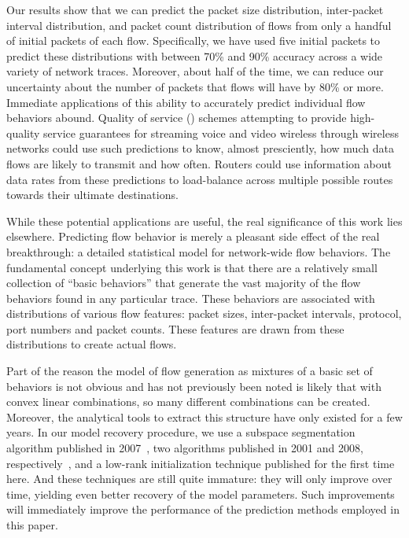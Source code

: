\documentclass[conference]{IEEEtran}
\begin{document}
Our results show that we can predict the packet size distribution, inter-packet interval distribution, and packet count distribution of flows from only a handful of initial packets of each flow.
Specifically, we have used five initial packets to predict these distributions with between 70\% and 90\% accuracy across a wide variety of network traces.
Moreover, about half of the time, we can reduce our uncertainty about the number of packets that flows will have by 80\% or more.
Immediate applications of this ability to accurately predict individual flow behaviors abound.
Quality of service () schemes attempting to provide high-quality service guarantees for streaming voice and video wireless through wireless networks could use such predictions to know, almost presciently, how much data flows are likely to transmit and how often.
Routers could use information about data rates from these predictions to load-balance across multiple possible routes towards their ultimate destinations.

While these potential applications are useful, the real significance of this work lies elsewhere.
Predicting flow behavior is merely a pleasant side effect of the real breakthrough:
a detailed statistical model for network-wide flow behaviors.
The fundamental concept underlying this work is that there are a relatively small collection of ``basic behaviors'' that generate the vast majority of the flow behaviors found in any particular trace.
These behaviors are associated with distributions of various flow features:
packet sizes, inter-packet intervals,  protocol, port numbers and packet counts.
These features are drawn from these distributions to create actual flows.

Part of the reason the model of flow generation as mixtures of a basic set of behaviors is not obvious and has not previously been noted is likely that with convex linear combinations, so many different combinations can be created.
Moreover, the analytical tools to extract this structure have only existed for a few years.
In our model recovery procedure, we use a subspace segmentation algorithm published in 2007~\cite{Ma07}, two  algorithms published in 2001 and 2008, respectively~\cite{Lee01,Kim08:anls}, and a low-rank  initialization technique published for the first time here.
And these techniques are still quite immature:
they will only improve over time, yielding even better recovery of the model parameters.
Such improvements will immediately improve the performance of the prediction methods employed in this paper.
\end{document}

